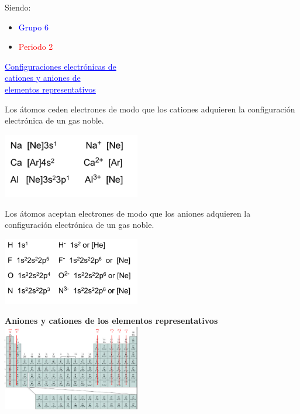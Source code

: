         Siendo: 
        \begin{itemize}
            \item \textcolor{blue}{Grupo 6}
            \item \textcolor{red}{Periodo 2}
        \end{itemize}

        \begin{center} \textcolor{blue}{\underline{Configuraciones electrónicas de}} \\ \textcolor{blue}{\underline{cationes y aniones de}} \\ \textcolor{blue}{\underline{elementos representativos}} \end{center}
            \indent Los átomos ceden electrones de modo que los cationes adquieren la configuración electrónica de un gas noble. 
            \begin{center} \includegraphics[width=6cm]{./imagenes/atomosCedenElectrones.png} \end{center}
            \indent Los átomos aceptan electrones de modo que los aniones adquieren la configuración electrónica de un gas noble.
            \begin{center} \includegraphics[width=6cm]{./imagenes/atomosAceptanElectrones.png}\end{center}

        \begin{center}
            \textbf{Aniones y cationes de los elementos representativos} \\
            \includegraphics[width=6cm]{./imagenes/anionesYCationesDeElementosRepresentativos.png}
        \end{center}

